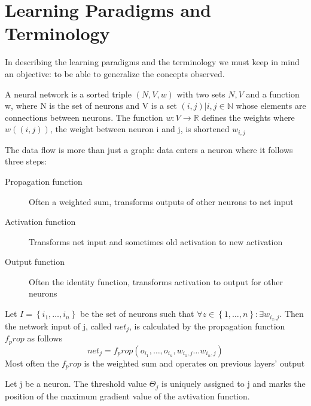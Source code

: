 \section{Learning Paradigms and Terminology}
In describing the learning paradigms and the terminology we must keep in mind an objective: to be able to generalize the concepts observed.
\begin{definition}
    A neural network is a sorted triple $(N,V,w)$ with two sets $N,V$ and a function w, where N is the set of neurons and V is a set ${(i,j)|i,j\in\mathbb{N}}$ whose elements are connections between neurons. The function $w: V \longrightarrow \mathbb{R}$ defines the weights where $w((i,j))$, the weight between neuron i and j, is shortened $w_{i,j}$
\end{definition}
The data flow is more than just a graph: data enters a neuron where it follows three steps:
\begin{description}
    \item[Propagation function] Often a weighted sum, transforms outputs of other neurons to net input
    \item[Activation function] Transforms net input and sometimes old activation to new activation
    \item[Output function] Often the identity function, transforms activation to output for other neurons
\end{description}
\begin{definition}
    Let $I = \left\{ i_{1}, \ldots,i_{n} \right\}$ be the set of neurons such that $\forall z\in \left\{ 1, \ldots, n \right\} : \exists w_{i_z,j}$. Then the network input of j, called $net_j$, is calculated by the propagation function $f_prop$ as follows
    \[ 
        net_j = f_prop(o_{i_1},\ldots, o_{i_n}, w_{i_1,j} \ldots w_{i_n,j}) 
    \]
    Most often the $f_prop$ is the weighted sum and operates on previous layers' output
\end{definition}
\begin{definition}
    Let j be a neuron. The threshold value $\Theta_j$ is uniquely assigned to j and marks the position of the maximum gradient value of the avtivation function.
\end{definition}

